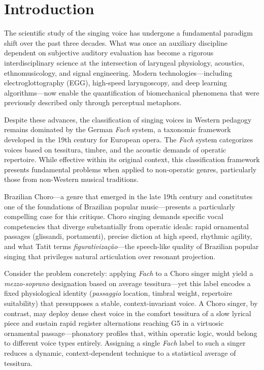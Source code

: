 \documentclass[review,3p,number]{elsarticle}
\begin{document}
\section{Introduction}
\label{sec:introduction}

The scientific study of the singing voice has undergone a fundamental paradigm shift
over the past three decades. What was once an auxiliary discipline dependent on
subjective auditory evaluation has become a rigorous interdisciplinary science at the
intersection of laryngeal physiology, acoustics, ethnomusicology, and signal
engineering.\cite{roubeau2009,henrich2006} Modern technologies---including
electroglottography (EGG), high-speed laryngoscopy, and deep learning
algorithms---now enable the quantification of biomechanical phenomena that were
previously described only through perceptual metaphors.

Despite these advances, the classification of singing voices in Western pedagogy
remains dominated by the German \emph{Fach} system, a taxonomic framework developed
in the 19th century for European opera.\cite{cotton2007,miller2000} The \emph{Fach}
system categorizes voices based on tessitura, timbre, and the acoustic demands of
operatic repertoire. While effective within its original context, this classification
framework presents fundamental problems when applied to non-operatic genres,
particularly those from non-Western musical traditions.

Brazilian Choro---a genre that emerged in the late 19th century and constitutes one
of the foundations of Brazilian popular music---presents a particularly compelling
case for this critique. Choro singing demands specific vocal competencies that
diverge substantially from operatic ideals: rapid ornamental passages (glissandi,
portamenti), precise diction at high speed, rhythmic agility, and what Tatit
terms \emph{figurativiza\c{c}\~{a}o}---the speech-like quality of Brazilian
popular singing that privileges natural articulation over resonant
projection.\cite{tatit2002,rezende2016}

Consider the problem concretely: applying \emph{Fach} to a Choro singer might yield
a \emph{mezzo-soprano} designation based on average tessitura---yet this label
encodes a fixed physiological identity (\emph{passaggio} location, timbral weight,
repertoire suitability) that presupposes a stable, context-invariant voice. A Choro
singer, by contrast, may deploy dense chest voice in the comfort tessitura of a slow
lyrical piece and sustain rapid register alternations reaching G5 in a virtuosic
ornamental passage---phonatory profiles that, within operatic logic, would belong to
different voice types entirely. Assigning a single \emph{Fach} label to such a singer
reduces a dynamic, context-dependent technique to a statistical average of
tessitura.\cite{rezende2016}
\end{document}
